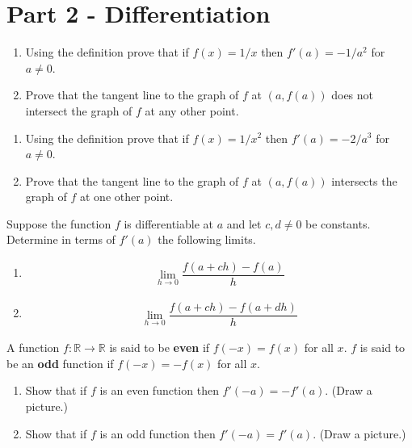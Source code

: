 \documentclass[9pt, a4paper, oneside]{amsart}
\begin{document}
	\section*{Part 2 - Differentiation}
	\begin{questions}[resume]
		\item
		\begin{enumerate}
			\item Using the definition prove that if $ f(x)=1/x$ then $ f'(a) = -1/a^2$ for $ a \neq 0$.
			\item Prove that the tangent line to the graph of $ f$ at $ (a,f(a))$ does not intersect the graph of $ f$ at any other point.
		\end{enumerate}

		\item
		\begin{enumerate}
			\item Using the definition prove that if $ f(x)=1/x^2$ then $ f'(a) = -2/a^3$ for $ a \neq 0$.
			\item Prove that the tangent line to the graph of $ f$ at $ (a,f(a))$ intersects the graph of $ f$ at one other point.
		\end{enumerate}


		\item Suppose the function $ f$ is differentiable at $ a$ and let $ c , d \neq 0$ be constants. Determine in terms of $ f'(a)$ the following limits.
		\begin{enumerate}
			\item \begin{align*}
			      \lim \limits_{h \rightarrow 0} \dfrac{f(a+ch) - f(a)}{h}
			\end{align*}
			\item \begin{align*}
			      \lim \limits_{h \rightarrow 0} \dfrac{f(a+ch) - f(a+dh)}{h}
			\end{align*}
		\end{enumerate}




		\item
		A function $ f: \mathbb{R} \rightarrow \mathbb{R}$ is said to be \textbf{even} if $ f(-x) = f(x)$ for all $ x$. $ f$ is said to be an \textbf{odd} function if $ f(-x) = -f(x)$ for all $ x$.
		\begin{enumerate}
			\item Show that if $ f$ is an even function then $ f'(-a) = -f'(a)$.
			      (Draw a picture.)
			\item Show that if $ f$ is an odd function then $ f'(-a) = f'(a)$.
			      (Draw a picture.)
		\end{enumerate}


\end{questions}
\end{document}
